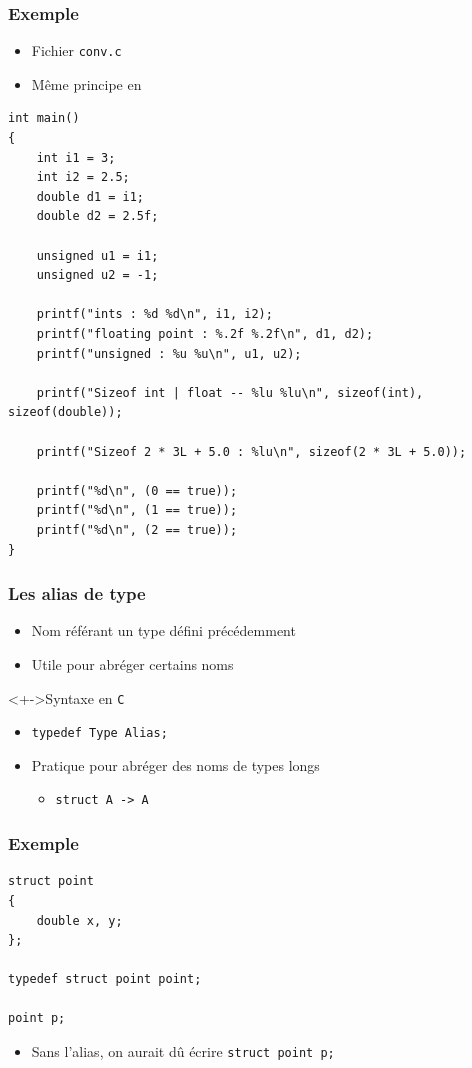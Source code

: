 \begin{frame}[containsverbatim]
\frametitle{Exemple}
\begin{itemize}
\item Fichier \texttt{conv.c}
\item Même principe en \cpp
\end{itemize}
\begin{lstlisting}
int main()
{
	int i1 = 3;
	int i2 = 2.5;
	double d1 = i1;
	double d2 = 2.5f;

	unsigned u1 = i1;
	unsigned u2 = -1;

	printf("ints : %d %d\n", i1, i2);
	printf("floating point : %.2f %.2f\n", d1, d2);
	printf("unsigned : %u %u\n", u1, u2);

	printf("Sizeof int | float -- %lu %lu\n", sizeof(int), sizeof(double));

	printf("Sizeof 2 * 3L + 5.0 : %lu\n", sizeof(2 * 3L + 5.0));

	printf("%d\n", (0 == true));
	printf("%d\n", (1 == true));
	printf("%d\n", (2 == true));
}
\end{lstlisting}
\end{frame}

\begin{frame}
\frametitle{Les alias de type}
\begin{itemize}[<+->]
\item Nom référant un type défini précédemment
\item Utile pour abréger certains noms
\end{itemize}
\begin{exampleblock}<+->{Syntaxe en \texttt{C}}
	\begin{itemize}[<+->]
	\item \lstinline|typedef Type Alias;|
	\end{itemize}
\end{exampleblock}
\begin{itemize}[<+->]
\item Pratique pour abréger des noms de types longs
	\begin{itemize}
	\item \texttt{struct A -> A}
	\end{itemize}
\end{itemize}
\end{frame}

\begin{frame}[containsverbatim]
\frametitle{Exemple}
\begin{lstlisting}
struct point 
{
	double x, y;
};

typedef struct point point;

point p;
\end{lstlisting}
\begin{itemize}
\item Sans l'alias, on aurait dû écrire \texttt{struct point p;}
\end{itemize}
\end{frame}


